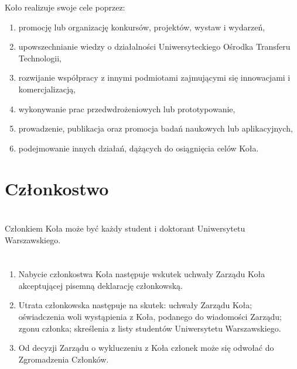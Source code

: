 \documentclass[a4paper]{article}
\begin{document}
Koło realizuje swoje cele poprzez:
\begin{enumerate}[label=\alph*)]
\item promocję lub organizację konkursów, projektów, wystaw i wydarzeń,
\item upowszechnianie wiedzy o działalności Uniwersyteckiego Ośrodka Transferu Technologii,%
\item rozwijanie współpracy z innymi podmiotami zajmującymi się innowacjami i komercjalizacją,%
\item wykonywanie prac przedwdrożeniowych lub prototypowanie,
\item prowadzenie, publikacja oraz promocja badań naukowych lub aplikacyjnych,
\item podejmowanie innych działań, dążących do osiągnięcia celów Koła.
\end{enumerate}


\section*{Członkostwo~~~}
\section{}
Członkiem Koła może być każdy student i doktorant Uniwersytetu Warszawskiego.

\section{}
\begin{enumerate}
\item Nabycie członkostwa Koła następuje wskutek uchwały Zarządu Koła akceptującej pisemną deklarację członkowską.
\item Utrata członkowska następuje na skutek: uchwały Zarządu Koła; oświadczenia woli wystąpienia z Koła, podanego do wiadomości Zarządu; zgonu członka; skreślenia z listy studentów Uniwersytetu Warszawskiego.
\item Od decyzji Zarządu o wykluczeniu z Koła członek może się odwołać do Zgromadzenia Członków.
\end{enumerate}
\end{document}
